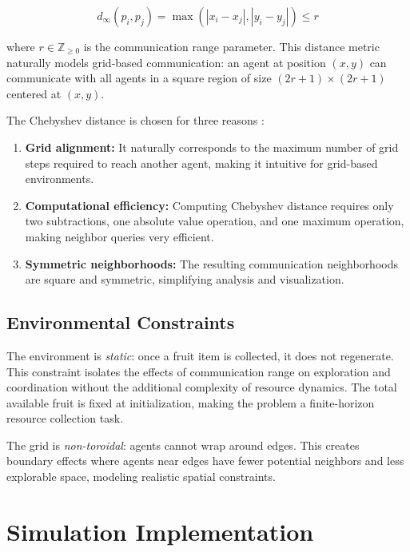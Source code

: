 \begin{equation}
d_{\infty}(p_i, p_j) = \max(|x_i - x_j|, |y_i - y_j|) \le r
\end{equation}

where $r \in \mathbb{Z}_{\ge 0}$ is the communication range parameter. This distance metric naturally models grid-based communication: an agent at position $(x, y)$ can communicate with all agents in a square region of size $(2r+1) \times (2r+1)$ centered at $(x, y)$.

The Chebyshev distance is chosen for three reasons \citep{deza2009encyclopedia}:

\begin{enumerate}
    \item \textbf{Grid alignment:} It naturally corresponds to the maximum number of grid steps required to reach another agent, making it intuitive for grid-based environments.

    \item \textbf{Computational efficiency:} Computing Chebyshev distance requires only two subtractions, one absolute value operation, and one maximum operation, making neighbor queries very efficient.

    \item \textbf{Symmetric neighborhoods:} The resulting communication neighborhoods are square and symmetric, simplifying analysis and visualization.
\end{enumerate}

\subsection{Environmental Constraints}

The environment is \emph{static}: once a fruit item is collected, it does not regenerate. This constraint isolates the effects of communication range on exploration and coordination without the additional complexity of resource dynamics. The total available fruit is fixed at initialization, making the problem a finite-horizon resource collection task.

The grid is \emph{non-toroidal}: agents cannot wrap around edges. This creates boundary effects where agents near edges have fewer potential neighbors and less explorable space, modeling realistic spatial constraints.

\section{Simulation Implementation}

